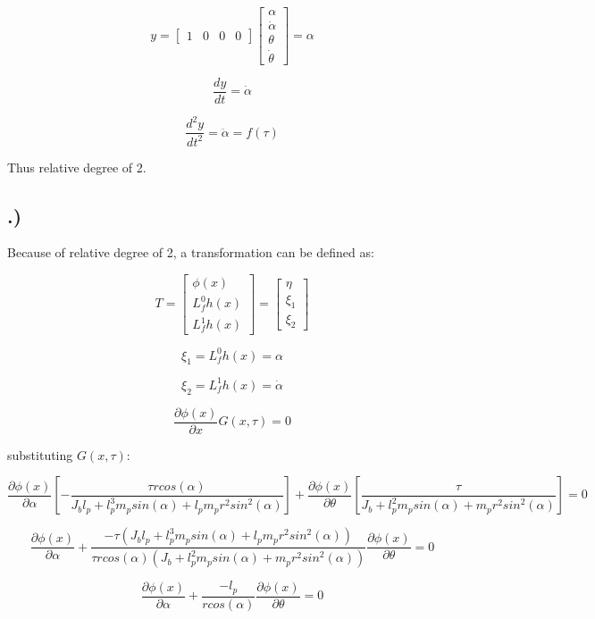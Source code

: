 \documentclass[10pt, letterpaper]{article}
\begin{document}
\[
y = \left[\begin{matrix}
1 & 0 & 0 & 0\end{matrix}\right]
\left[\begin{matrix}
\alpha\\
\dot{\alpha}\\
\theta\\
\dot{\theta}\end{matrix}\right] = \alpha
\]

\[
\frac{dy}{dt} = \dot{\alpha}
\]

\[
\frac{d^{2}y}{dt^{2}} = \ddot{\alpha} = f(\tau)
\]

Thus relative degree of 2.

\subsection{.)}

Because of relative degree of 2, a transformation can be defined as:

\[
T = \left[\begin{matrix}
\phi(x)\\
L^{0}_{f}h(x)\\
L^{1}_{f}h(x)
\end{matrix}\right]
=
\left[\begin{matrix}
\eta\\
\xi_{1}\\
\xi_{2}
\end{matrix}\right]
\]

\[
\xi_{1} = L^{0}_{f}h(x) = \alpha
\]

\[
\xi_{2} = L^{1}_{f}h(x) = \dot{\alpha}
\]

\[
\frac{\partial{\phi(x)}}{\partial{x}}G(x, \tau) = 0
\]

substituting $G(x, \tau)$:

\[
\frac{\partial{\phi(x)}}{\partial{\alpha}}[- \frac{\tau r {cos}(\alpha)}{J_{b} l_{p} + l_{p}^{3} m_{p} {sin}(\alpha) + l_{p} m_{p} r^{2} {sin}^{2}(\alpha)}] + 
\frac{\partial{\phi(x)}}{\partial{\theta}}[\frac{\tau}{J_{b} + l_{p}^{2} m_{p} {sin}(\alpha) + m_{p} r^{2} {sin}^{2}(\alpha)}] = 0
\]

\[
\frac{\partial{\phi(x)}}{\partial{\alpha}} + \frac{-\tau(J_{b} l_{p} + l_{p}^{3} m_{p} {sin}(\alpha) + l_{p} m_{p} r^{2} {sin}^{2}(\alpha))}{\tau r {cos}(\alpha)(J_{b} + l_{p}^{2} m_{p} {sin}(\alpha) + m_{p} r^{2} {sin}^{2}(\alpha))}\frac{\partial{\phi(x)}}{\partial{\theta}} = 0
\]

\[
\frac{\partial{\phi(x)}}{\partial{\alpha}} + \frac{-l_{p}}{r {cos}(\alpha)}\frac{\partial{\phi(x)}}{\partial{\theta}} = 0
\]
\end{document}
